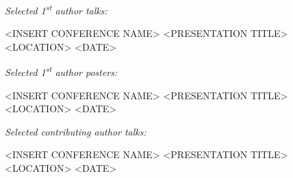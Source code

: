 


\begin{cventries}

\vspace{-0.2cm}
\textit{Selected 1\textsuperscript{st} author talks:}

\cventry
{<INSERT CONFERENCE NAME>} %
{<PRESENTATION TITLE>} %
{<LOCATION>} %
{<DATE>} %
{}
\vspace{-0.5cm}



\vspace{-0.2cm}
\textit{Selected 1\textsuperscript{st} author posters:}

\cventry
{<INSERT CONFERENCE NAME>} %
{<PRESENTATION TITLE>} %
{<LOCATION>} %
{<DATE>} %
{}
\vspace{-0.5cm}




\vspace{-0.2cm}
\textit{Selected contributing author talks:}

\cventry
{<INSERT CONFERENCE NAME>} %
{<PRESENTATION TITLE>} %
{<LOCATION>} %
{<DATE>} %
{}
\vspace{-0.5cm}




\end{cventries}